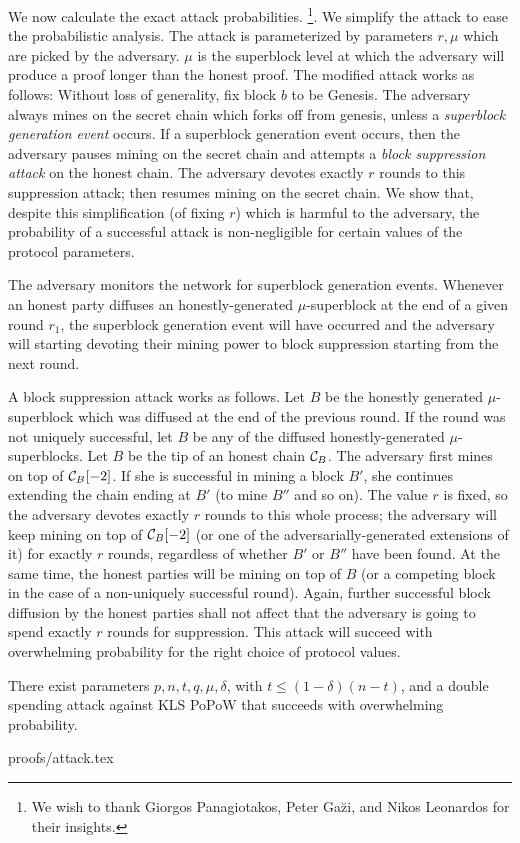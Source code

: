 We now calculate the exact attack probabilities.
\footnote{We wish to thank Giorgos Panagiotakos, Peter Ga\u{z}i, and Nikos
Leonardos for their insights.}.
We simplify the attack to ease the probabilistic analysis. The attack is
parameterized by  parameters $r, \mu$ which are picked by the adversary. $\mu$
is the superblock level at which the adversary will produce a proof longer than
the honest proof. The modified attack works as follows: Without loss of
generality, fix block $b$ to be Genesis. The adversary always mines on the
secret chain which forks off from genesis, unless a \textit{superblock
generation event} occurs. If a superblock generation event occurs, then the
adversary pauses mining on the secret chain and attempts a \textit{block
suppression attack} on the honest chain. The adversary devotes exactly $r$
rounds to this suppression attack; then resumes mining on the secret chain. We
show that, despite this simplification (of fixing $r$) which is harmful to the
adversary, the probability of a successful attack is non-negligible for certain
values of the protocol parameters.

The adversary monitors the network for superblock generation events. Whenever an
honest party diffuses an honestly-generated $\mu$-superblock at the end of a
given round $r_1$, the superblock generation event will have occurred and the
adversary will starting devoting their mining power to block suppression
starting from the next round.

A block suppression attack works as follows. Let $B$ be the honestly generated
$\mu$-superblock which was diffused at the end of the previous round. If the
round was not uniquely successful, let $B$ be any of the diffused
honestly-generated $\mu$-superblocks. Let $B$ be the tip of an honest chain
$\mathcal{C}_B$. The adversary first mines on top of $\mathcal{C}_B[-2]$. If she is
successful in mining a block $B'$, she continues extending the chain ending
at $B'$ (to mine $B''$ and so on). The value $r$ is fixed, so the adversary
devotes exactly $r$ rounds to this whole process; the adversary will keep mining
on top of $\mathcal{C}_B[-2]$ (or one of the adversarially-generated extensions of
it) for exactly $r$ rounds, regardless of whether $B'$ or $B''$ have been found.
At the same time, the honest parties will be mining on top of $B$ (or a
competing block in the case of a non-uniquely successful round). Again, further
successful block diffusion by the honest parties shall not affect that the
adversary is going to spend exactly $r$ rounds for suppression.
This attack will succeed with overwhelming probability for the right choice
of protocol values.

\begin{theorem}
There exist parameters $p, n, t, q,  \mu, \delta$, with $t\leq (1-\delta)(n-t)$,
and a double spending attack against KLS PoPoW that succeeds with overwhelming
probability.
\end{theorem}
{proofs/attack.tex}

